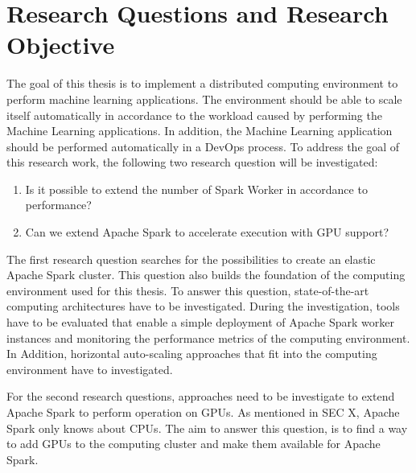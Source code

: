 


\section{Research Questions and Research Objective}
The goal of this thesis is to implement a distributed computing environment to perform machine learning applications. The environment should be able to scale itself automatically in accordance to the workload caused by performing the Machine Learning applications. In addition, the Machine Learning application should be performed automatically in a DevOps process. To address the goal of this research work, the following two research question will be investigated:


\begin{enumerate}
\item Is it possible to extend the number of Spark Worker in accordance to performance?
\item Can we extend Apache Spark to accelerate execution with GPU support?
\end{enumerate}


The first research question searches for the possibilities to create an elastic Apache Spark cluster. This question also builds the foundation of the computing environment used for this thesis. To answer this question, state-of-the-art computing architectures have to be investigated. During the investigation, tools have to be evaluated that enable a simple deployment of Apache Spark worker instances and monitoring the performance metrics of the computing environment. In Addition, horizontal auto-scaling approaches that fit into the computing environment have to investigated.


For the second research questions, approaches need to be investigate to extend Apache Spark to perform operation on GPUs. As mentioned in SEC X, Apache Spark only knows about CPUs. The aim to answer this question, is to find a way to add GPUs to the computing cluster and make them available for Apache Spark.



